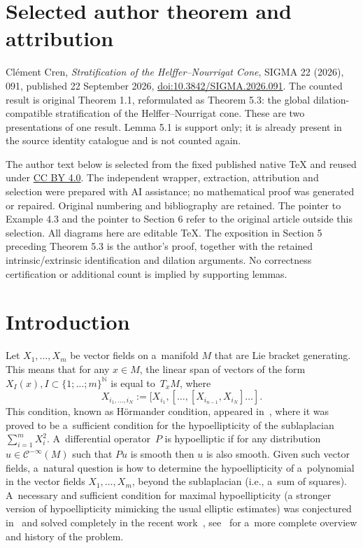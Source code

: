 \documentclass[10pt,a4paper]{article}
\newcommand{\N}{\mathbb N} %
\newcommand{\CCC}{\mathscr{C}} %
\numberwithin{equation}{section}
\theoremstyle{definition}
\begin{document}
\section*{Selected author theorem and attribution}
Cl\'ement Cren, \emph{Stratification of the Helffer--Nourrigat Cone},
SIGMA 22 (2026), 091, published 22 September 2026,
\href{https://doi.org/10.3842/SIGMA.2026.091}{doi:10.3842/SIGMA.2026.091}.
The counted result is original Theorem 1.1, reformulated as Theorem 5.3:
the global dilation-compatible stratification of the Helffer--Nourrigat cone.
These are two presentations of one result. Lemma 5.1 is support only;
it is already present in the source identity catalogue and is not counted again.

The author text below is selected from the fixed published native TeX and reused
under \href{https://creativecommons.org/licenses/by/4.0/}{CC BY 4.0}.
The independent wrapper, extraction, attribution and selection were prepared with AI assistance;
no mathematical proof was generated or repaired.
Original numbering and bibliography are retained. The pointer to Example 4.3
and the pointer to Section 6 refer to the original article outside this selection. All diagrams here are editable TeX.
The exposition in Section 5 preceding Theorem 5.3 is the author's proof, together
with the retained intrinsic/extrinsic identification and dilation arguments.
No correctness certification or additional count is implied by supporting lemmas.

\section{Introduction}

Let $X_1, \dots, X_m$ be vector fields on a~manifold $M$ that are Lie bracket generating. This means that for any $x \in M$, the linear span of vectors of the form $X_I(x), I\subset \{1;\dots;m\}^{\N}$ is equal to~$T_xM$, where
\[X_{i_1,\dots,i_N} := [X_{i_1},[\dots,[X_{i_{n-1}},X_{i_N}]\dots].
\]
This condition, known as H\"ormander condition, appeared in~\cite{Hormander}, where it was proved to be a~sufficient condition for the hypoellipticity of the sublaplacian $\sum_{i=1}^m X_i^2$. A~differential operator~$P$ is hypoelliptic if for any distribution $u \in \CCC^{-\infty}(M)$ such that $Pu$ is smooth then $u$ is also smooth.
Given such vector fields, a~natural question is how to determine the hypoellipticity of a~polynomial in the vector fields $X_1, \dots, X_m$, beyond the sublaplacian (i.e., a~sum of squares). A~necessary and sufficient condition for maximal hypoellipticity (a stronger version of hypoellipticity mimicking the usual elliptic estimates) was conjectured in~\cite{HelfferNourrigatPaper} and solved completely in the recent work~\cite{AMYMaximalHypoellipticity}, see~\cite{DebordBourbaki,HelfferNourrigatBook} for a~more complete overview and history of the problem.
\end{document}

